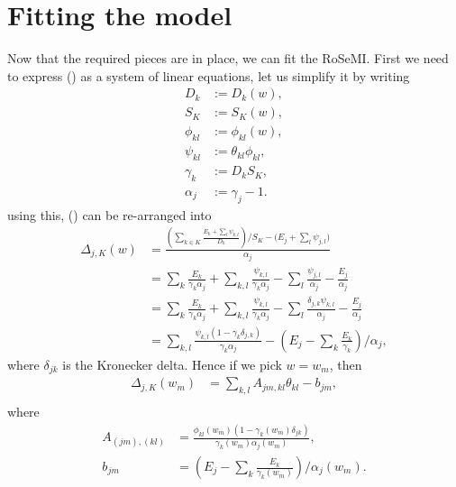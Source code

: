 \documentclass[12pt]{article}
\def\D{\displaystyle}
\begin{document}
\section{Fitting the model}
Now that the required pieces are in place, we can fit the RoSeMI. First we need to express () as a system of linear equations, let us simplify it by writing
\begin{equation*}
	\label{eq:simp}
    \begin{split}
        D_k &:= D_k(w), \\
        S_K &:= S_K(w), \\
        \phi_{kl} &:= \phi_{kl}(w),\\
        \psi_{kl} &:= \theta_{kl}\phi_{kl}, \\
        \gamma_k &:= D_kS_K, \\
        \alpha_j &:= \gamma_j-1.
    \end{split}
\end{equation*}
using this, () can be re-arranged into
\begin{equation}
    \label{eq:delta_split}
    \begin{split}
        \Delta_{j,K}(w)&= \frac{\D \left(\sum_{k\in K} \frac{E_k + \sum_l \psi_{k,l}}{D_k} \right)/ S_K - \big(E_j + \sum_l \psi_{j,l}\big)}{\alpha_j} \\
        &= \sum_k \frac{E_k}{\gamma_k\alpha_j} + \sum_{k,l} \frac{\psi_{k,l}}{\gamma_k\alpha_j} - \sum_{l} \frac{\psi_{j,l}}{\alpha_j} - \frac{E_j}{\alpha_j}\\
        &= \sum_k \frac{E_k}{\gamma_k\alpha_j} + \sum_{k,l} \frac{\psi_{k,l}}{\gamma_k\alpha_j} - \sum_{l} \frac{\delta_{j,k}\psi_{k,l}}{\alpha_j} - \frac{E_j}{\alpha_j}\\
        &= \sum_{k,l} \frac{\psi_{k,l} (1-\gamma_k\delta_{j,k})}{\gamma_k\alpha_j} - \left(E_j - \sum_k\frac{E_k}{\gamma_k}\right)/\alpha_j,
    \end{split}
\end{equation}
where $\delta_{jk}$ is the Kronecker delta. Hence if we pick $w = w_m$, then
\begin{equation}
	\begin{split}
		\Delta_{j,K}(w_m) &= \sum_{k,l} A_{jm, kl} \theta_{kl} - b_{jm}, \\
	\end{split}	
\end{equation}
where
\begin{equation}
	\begin{split}
		A_{(jm), (kl)} &= \frac{\phi_{kl}(w_m)(1 - \gamma_k(w_m) \delta_{jk})}{\gamma_k(w_m) \alpha_j(w_m)},\\
		b_{jm} &= \left(E_j - \sum_k\frac{E_k}{\gamma_k(w_m)}\right)/\alpha_j(w_m).
	\end{split}
\end{equation}
\end{document}
